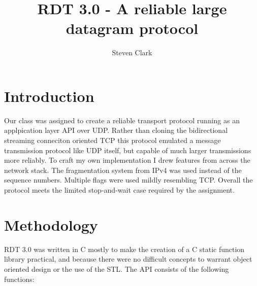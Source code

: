 \documentclass[11pt]{article}
\title{RDT 3.0 - A reliable large datagram protocol}
\author{Steven Clark}
\begin{document}
\maketitle

\section{Introduction}
Our class was assigned to create a reliable transport protocol running as an applpication layer API over UDP.  Rather than cloning the bidirectional streaming conneciton oriented TCP this protocol emulated a message transmission protocol like UDP itself, but capable of much larger transmissions more reliably.  To craft my own implementation I drew features from across the network stack.  The fragmentation system from IPv4 was used instead of the sequence numbers.  Multiple flags were used mildly resembling TCP.  Overall the protocol meets the limited stop-and-wait case required by the assignment.

\section{Methodology}
RDT 3.0 was written in C mostly to make the creation of a C static function library practical, and because there were no difficult concepts to warrant object oriented design or the use of the STL.  The API consists of the following functions:
\end{document}
